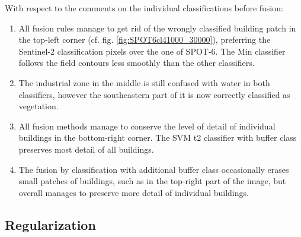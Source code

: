 \documentclass[10pt]{article}
\newcommand{\tile}{41000_30000}
\begin{document}
With respect to the comments on the individual classifications before fusion:
\begin{enumerate}
    \item All fusion rules manage to get rid of the wrongly classified building patch in the top-left corner (cf. fig. \ref{fig:SPOT6cl\tile}), preferring the Sentinel-2 classification pixels over the one of SPOT-6. The Min classifier follows the field contours less smoothly than the other classifiers.
    \item The industrial zone in the middle is still confused with water in both classifiers, however the southeastern part of it is now correctly classified as vegetation.
    \item All fusion methods manage to conserve the level of detail of individual buildings in the bottom-right corner. The SVM t2 classifier with buffer class preserves most detail of all buildings.
    \item The fusion by classification with additional buffer class occasionally erases small patches of buildings, such as in the top-right part of the image, but overall manages to preserve more detail of individual buildings.
\end{enumerate}

\subsection{Regularization}
\end{document}
